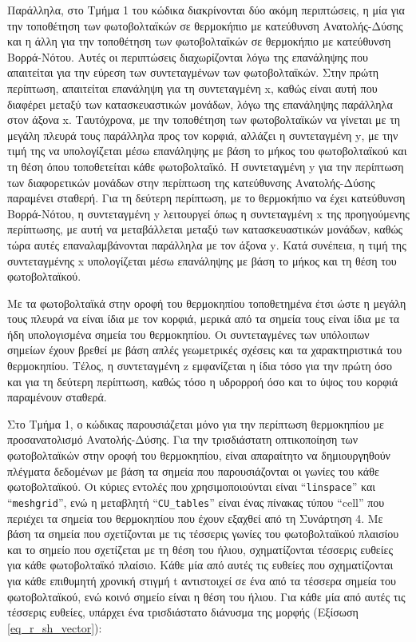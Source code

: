 \documentclass[12pt, a4paper]{report} %
\newcommand{\english}{\foreignlanguage{english}}
\begin{document}
Παράλληλα, στο Τμήμα 1 του κώδικα διακρίνονται δύο ακόμη περιπτώσεις, η μία για την τοποθέτηση των φωτοβολταϊκών σε θερμοκήπιο με 
κατεύθυνση Ανατολής-Δύσης και η άλλη για την τοποθέτηση των φωτοβολταϊκών σε θερμοκήπιο με κατεύθυνση Βορρά-Νότου. Αυτές οι 
περιπτώσεις διαχωρίζονται λόγω της επανάληψης που απαιτείται για την εύρεση των συντεταγμένων των φωτοβολταϊκών. Στην πρώτη 
περίπτωση, απαιτείται επανάληψη για τη συντεταγμένη \english{x}, καθώς είναι αυτή που διαφέρει μεταξύ των κατασκευαστικών μονάδων, 
λόγω της επανάληψης παράλληλα στον άξονα \english{x}. Ταυτόχρονα, με την τοποθέτηση των φωτοβολταϊκών να γίνεται με τη μεγάλη 
πλευρά τους παράλληλα προς τον κορφιά, αλλάζει η συντεταγμένη \english{y}, με την τιμή της να υπολογίζεται μέσω επανάληψης με 
βάση το μήκος του φωτοβολταϊκού και τη θέση όπου τοποθετείται κάθε φωτοβολταϊκό. Η συντεταγμένη \english{y} για την περίπτωση των 
διαφορετικών μονάδων στην περίπτωση της κατεύθυνσης Ανατολής-Δύσης παραμένει σταθερή. Για τη δεύτερη περίπτωση, με το θερμοκήπιο να 
έχει κατεύθυνση Βορρά-Νότου, η συντεταγμένη \english{y} λειτουργεί όπως η συντεταγμένη \english{x} της προηγούμενης περίπτωσης, με 
αυτή να μεταβάλλεται μεταξύ των κατασκευαστικών μονάδων, καθώς τώρα αυτές επαναλαμβάνονται παράλληλα με τον άξονα \english{y}. Κατά 
συνέπεια, η τιμή της συντεταγμένης \english{x} υπολογίζεται μέσω επανάληψης με βάση το μήκος και τη θέση του φωτοβολταϊκού.

Με τα φωτοβολταϊκά στην οροφή του θερμοκηπίου τοποθετημένα έτσι ώστε η μεγάλη τους πλευρά να είναι ίδια με τον κορφιά, μερικά από 
τα σημεία τους είναι ίδια με τα ήδη υπολογισμένα σημεία του θερμοκηπίου. Οι συντεταγμένες των υπόλοιπων σημείων έχουν βρεθεί με βάση 
απλές γεωμετρικές σχέσεις και τα χαρακτηριστικά του θερμοκηπίου. Τέλος, η συντεταγμένη \english{z} εμφανίζεται η ίδια τόσο για την 
πρώτη όσο και για τη δεύτερη περίπτωση, καθώς τόσο η υδρορροή όσο και το ύψος του κορφιά παραμένουν σταθερά.

Στο Τμήμα 1, ο κώδικας παρουσιάζεται μόνο για την περίπτωση θερμοκηπίου με προσανατολισμό Ανατολής-Δύσης. Για την τρισδιάστατη 
οπτικοποίηση των φωτοβολταϊκών στην οροφή του θερμοκηπίου, είναι απαραίτητο να δημιουργηθούν πλέγματα δεδομένων με βάση τα σημεία 
που παρουσιάζονται οι γωνίες του κάθε φωτοβολταϊκού. Οι κύριες εντολές που χρησιμοποιούνται είναι “\texttt{\english{linspace}}” 
και “\texttt{\english{meshgrid}}”, ενώ η μεταβλητή “\texttt{\english{CU\_tables}}” είναι ένας πίνακας τύπου “\english{cell}” που 
περιέχει τα σημεία του θερμοκηπίου που έχουν εξαχθεί από τη Συνάρτηση 4. Με βάση τα σημεία που σχετίζονται με τις τέσσερις γωνίες 
του φωτοβολταϊκού πλαισίου και το σημείο που σχετίζεται με τη θέση του ήλιου, σχηματίζονται τέσσερις ευθείες για κάθε φωτοβολταϊκό 
πλαίσιο. Κάθε μία από αυτές τις ευθείες που σχηματίζονται για κάθε επιθυμητή χρονική στιγμή \english{t} αντιστοιχεί σε ένα από τα 
τέσσερα σημεία του φωτοβολταϊκού, ενώ κοινό σημείο είναι η θέση του ήλιου. Για κάθε μία από αυτές τις τέσσερις ευθείες, υπάρχει ένα 
τρισδιάστατο διάνυσμα της μορφής (Εξίσωση \ref{eq_r_sh_vector}):
\end{document}
